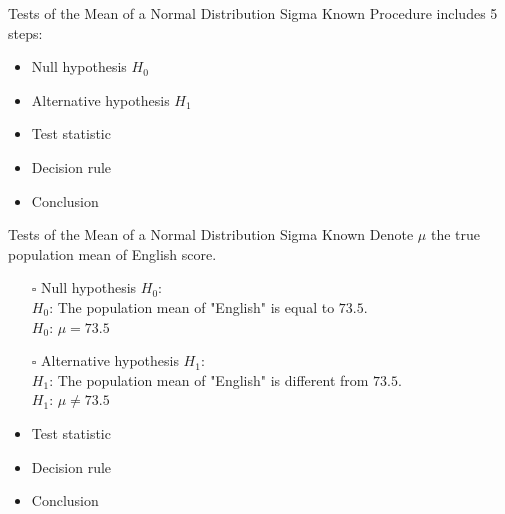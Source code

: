 \documentclass[
  10pt,
  ignorenonframetext,
]{beamer}
\providecommand{\tightlist}{%
  \setlength{\itemsep}{0pt}\setlength{\parskip}{0pt}}
\begin{document}
\begin{frame}{Tests of the Mean of a Normal Distribution Sigma Known}
\protect\hypertarget{tests-of-the-mean-of-a-normal-distribution-sigma-known}{}
Procedure includes 5 steps:

\begin{itemize}
\tightlist
\item
  Null hypothesis \(H_0\)
\item
  Alternative hypothesis \(H_1\)
\item
  Test statistic
\item
  Decision rule
\item
  Conclusion
\end{itemize}
\end{frame}

\begin{frame}{Tests of the Mean of a Normal Distribution Sigma Known}
\protect\hypertarget{tests-of-the-mean-of-a-normal-distribution-sigma-known-1}{}
Denote \(\mu\) the true population mean of English score.

\begin{itemize}
    \item [$\square$] Null hypothesis $H_0$:\\
      $H_0$: The population mean of "English" is equal to $73.5$.\\  
      $H_0$: $\mu = 73.5$
    \vspace{2mm}
    \item [$\square$] Alternative hypothesis $H_1$:\\
      $H_1$: The population mean of "English" is different from $73.5$.\\  
      $H_1$: $\mu \neq 73.5$
    \vspace{2mm}
    \item Test statistic
    \item Decision rule
    \item Conclusion
\end{itemize}
\end{frame}
\end{document}
